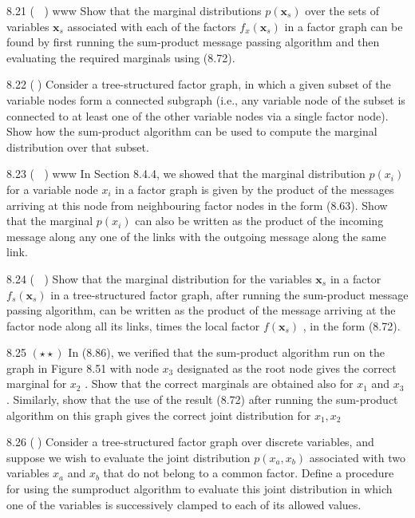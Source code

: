 \documentclass[
  10
]{article}
\begin{document}
8.21 ( ) www Show that the marginal distributions
\(p ( \mathbf { x } _ { s } )\) over the sets of variables
\(\mathbf { x } _ { s }\) associated with each of the factors
\(f _ { x } ( \mathbf { x } _ { s } )\) in a factor graph can be found
by first running the sum-product message passing algorithm and then
evaluating the required marginals using (8.72).

8.22 () Consider a tree-structured factor graph, in which a given subset
of the variable nodes form a connected subgraph (i.e., any variable node
of the subset is connected to at least one of the other variable nodes
via a single factor node). Show how the sum-product algorithm can be
used to compute the marginal distribution over that subset.

8.23 ( ) www In Section 8.4.4, we showed that the marginal distribution
\(p ( x _ { i } )\) for a variable node \(x _ { i }\) in a factor graph
is given by the product of the messages arriving at this node from
neighbouring factor nodes in the form (8.63). Show that the marginal
\(p ( x _ { i } )\) can also be written as the product of the incoming
message along any one of the links with the outgoing message along the
same link.

8.24 ( ) Show that the marginal distribution for the variables
\(\mathbf { x } _ { s }\) in a factor
\(f _ { s } ( \mathbf { x } _ { s } )\) in a tree-structured factor
graph, after running the sum-product message passing algorithm, can be
written as the product of the message arriving at the factor node along
all its links, times the local factor \(f ( \mathbf { x } _ { s } )\) ,
in the form (8.72).

8.25 \(( \star \star )\) In (8.86), we verified that the sum-product
algorithm run on the graph in Figure 8.51 with node \(x _ { 3 }\)
designated as the root node gives the correct marginal for \(x _ { 2 }\)
. Show that the correct marginals are obtained also for \(x _ { 1 }\)
and \(x _ { 3 }\) . Similarly, show that the use of the result (8.72)
after running the sum-product algorithm on this graph gives the correct
joint distribution for \(x _ { 1 } , x _ { 2 }\)

8.26 () Consider a tree-structured factor graph over discrete variables,
and suppose we wish to evaluate the joint distribution
\(p ( x _ { a } , x _ { b } )\) associated with two variables
\(x _ { a }\) and \(x _ { b }\) that do not belong to a common factor.
Define a procedure for using the sumproduct algorithm to evaluate this
joint distribution in which one of the variables is successively clamped
to each of its allowed values.
\end{document}
